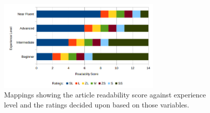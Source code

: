 \begin{figure}
	\caption[Aritcle Rating Mappings]{Mappings showing the article readability score against experience level and the ratings decided upon based on those variables.}
	\label{fig:ratings}
	\begin{center}
	\includegraphics[width=0.7\textwidth]{Graphics/Ratings}
\end{center}
\end{figure}
